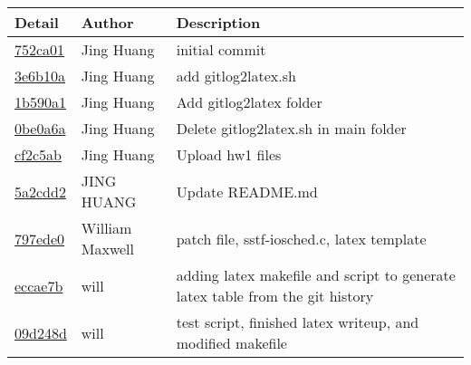 \begin{tabular}{l l l}\textbf{Detail} & \textbf{Author} & \textbf{Description}\\\hline
\href{https://github.com/jshota/CS_544_Group12/commit/752ca01c049820caee0c25eee2eb6699199983eb}{752ca01} & Jing Huang & initial commit\\\hline
\href{https://github.com/jshota/CS_544_Group12/commit/3e6b10a07d5478da1326c8cc8946d3b25fe040c9}{3e6b10a} & Jing Huang & add gitlog2latex.sh\\\hline
\href{https://github.com/jshota/CS_544_Group12/commit/1b590a180c992181e8f23ddc2aaa00321a694b9d}{1b590a1} & Jing Huang & Add gitlog2latex folder\\\hline
\href{https://github.com/jshota/CS_544_Group12/commit/0be0a6a594777ab808394a83bdbb58cdb60ba84d}{0be0a6a} & Jing Huang & Delete gitlog2latex.sh in main folder\\\hline
\href{https://github.com/jshota/CS_544_Group12/commit/cf2c5abbd53a5e81c70c30d7fd618ef291878a3f}{cf2c5ab} & Jing Huang & Upload hw1 files\\\hline
\href{https://github.com/jshota/CS_544_Group12/commit/5a2cdd25c9a62fecf0701252f91d99d940e41357}{5a2cdd2} & JING HUANG & Update README.md\\\hline
\href{https://github.com/jshota/CS_544_Group12/commit/797ede07d6b430b4fd07dba4f45b8c9166f79d48}{797ede0} & William Maxwell & patch file, sstf-iosched.c, latex template\\\hline
\href{https://github.com/jshota/CS_544_Group12/commit/eccae7b130c5ecb9d9ae4aad4287e6b9b74452b7}{eccae7b} & will & adding latex makefile and script to generate latex table from the git history\\\hline
\href{https://github.com/jshota/CS_544_Group12/commit/09d248d7278261ffd7662e0f9a70115dde1230ee}{09d248d} & will & test script, finished latex writeup, and modified makefile\\\hline\end{tabular}
